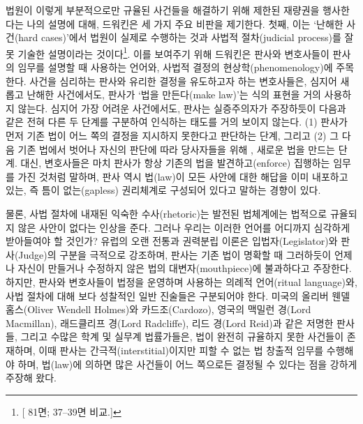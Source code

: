 법원이 이렇게 부분적으로만 규율된 사건들을 해결하기 위해 제한된 재량권을
행사한다는 나의 설명에 대해, 드워킨은 세 가지 주요 비판을 제기한다.
첫째, 이는 `난해한 사건(hard cases)'에서 법원이 실제로 수행하는 것과
사법적 절차(judicial process)를 잘못 기술한 설명이라는
것이다\footnote{{[} 81면;  37--39면 비교.{]}}. 이를
보여주기 위해 드워킨은 판사와 변호사들이 판사의 임무를 설명할 때
사용하는 언어와, 사법적 결정의 현상학(phenomenology)에 주목한다. 사건을
심리하는 판사와 유리한 결정을 유도하고자 하는 변호사들은, 심지어 새롭고
난해한 사건에서도, 판사가 `법을 만든다(make law)'는 식의 표현을 거의
사용하지 않는다. 심지어 가장 어려운 사건에서도, 판사는 실증주의자가
주장하듯이 다음과 같은 전혀 다른 두 단계를 구분하여 인식하는 태도를 거의
보이지 않는다. (1) 판사가 먼저 기존 법이 어느 쪽의 결정을 지시하지
못한다고 판단하는 단계, 그리고 (2) 그 다음 기존 법에서 벗어나 자신의
판단에 따라 당사자들을 위해 ,
 새로운 법을 만드는 단계. 대신, 변호사들은 마치
판사가 항상 기존의 법을 발견하고(enforce) 집행하는 임무를 가진 것처럼
말하며, 판사 역시 법(law)이 모든 사안에 대한 해답을 이미 내포하고 있는,
즉 틈이 없는(gapless) 권리체계로 구성되어 있다고 말하는 경향이 있다.

물론, 사법 절차에 내재된 익숙한 수사(rhetoric)는 발전된 법체계에는
법적으로 규율되지 않은 사안이 없다는 인상을 준다. 그러나 우리는 이러한
언어를 어디까지 심각하게 받아들여야 할 것인가? 유럽의 오랜 전통과
권력분립 이론은 입법자(Legislator)와 판사(Judge)의 구분을 극적으로
강조하며, 판사는 기존 법이 명확할 때 그러하듯이 언제나 자신이 만들거나
수정하지 않은 법의 대변자(mouthpiece)에 불과하다고 주장한다. 하지만,
판사와 변호사들이 법정을 운영하며 사용하는 의례적 언어(ritual
language)와, 사법 절차에 대해 보다 성찰적인 일반 진술들은 구분되어야
한다. 미국의 올리버 웬델 홈스(Oliver Wendell Holmes)와 카드조(Cardozo),
영국의 맥밀런 경(Lord Macmillan), 래드클리프 경(Lord Radcliffe), 리드
경(Lord Reid)과 같은 저명한 판사들, 그리고 수많은 학계 및 실무계
법률가들은, 법이 완전히 규율하지 못한 사건들이 존재하며, 이때 판사는
간극적(interstitial)이지만 피할 수 없는 법 창출적 임무를 수행해야 하며,
법(law)에 의하면 많은 사건들이 어느 쪽으로든 결정될 수 있다는 점을
강하게 주장해 왔다.

